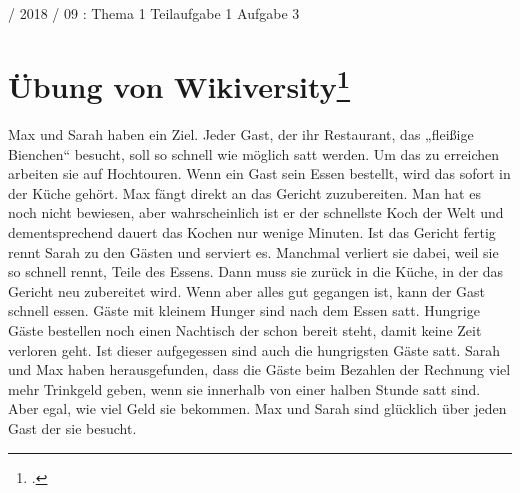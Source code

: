\documentclass{lehramt-informatik-haupt}
\begin{document}

 / 2018 / 09 : Thema 1 Teilaufgabe 1 Aufgabe 3

%

\section{Übung von Wikiversity\footcite{net:pdf:wikiversity:zustandsdiagramm}}

Max und Sarah haben ein Ziel. Jeder Gast, der ihr Restaurant, das
„fleißige Bienchen“ besucht, soll so schnell wie möglich satt werden. Um
das zu erreichen arbeiten sie auf Hochtouren. Wenn ein Gast sein Essen
bestellt, wird das sofort in der Küche gehört. Max fängt direkt an das
Gericht zuzubereiten. Man hat es noch nicht bewiesen, aber
wahrscheinlich ist er der schnellste Koch der Welt und dementsprechend
dauert das Kochen nur wenige Minuten. Ist das Gericht fertig rennt Sarah
zu den Gästen und serviert es. Manchmal verliert sie dabei, weil sie so
schnell rennt, Teile des Essens. Dann muss sie zurück in die Küche, in
der das Gericht neu zubereitet wird. Wenn aber alles gut gegangen ist,
kann der Gast schnell essen. Gäste mit kleinem Hunger sind nach dem
Essen satt. Hungrige Gäste bestellen noch einen Nachtisch der schon
bereit steht, damit keine Zeit verloren geht. Ist dieser aufgegessen
sind auch die hungrigsten Gäste satt. Sarah und Max haben
herausgefunden, dass die Gäste beim Bezahlen der Rechnung viel mehr
Trinkgeld geben, wenn sie innerhalb von einer halben Stunde satt sind.
Aber egal, wie viel Geld sie bekommen. Max und Sarah sind glücklich über
jeden Gast der sie besucht.


\literatur
\end{document}
